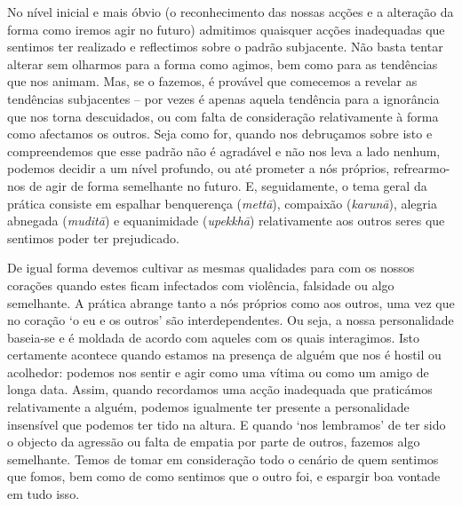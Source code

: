 No nível inicial e mais óbvio (o reconhecimento das nossas acções e a alteração
da forma como iremos agir no futuro) admitimos quaisquer acções inadequadas que
sentimos ter realizado e reflectimos sobre o padrão subjacente. Não basta tentar
alterar sem olharmos para a forma como agimos, bem como para as tendências que
nos animam. Mas, se o fazemos, é provável que comecemos a revelar as tendências
subjacentes -- por vezes é apenas aquela tendência para a ignorância que nos
torna descuidados, ou com falta de consideração relativamente à forma como
afectamos os outros. Seja como for, quando nos debruçamos sobre isto e
compreendemos que esse padrão não é agradável e não nos leva a lado nenhum,
podemos decidir a um nível profundo, ou até prometer a nós próprios,
refrearmo-nos de agir de forma semelhante no futuro. E, seguidamente, o tema
geral da prática consiste em espalhar benquerença (\emph{mettā}), compaixão
(\emph{karunā}), alegria abnegada (\emph{muditā}) e equanimidade
(\emph{upekkhā}) relativamente aos outros seres que sentimos poder ter
prejudicado.

De igual forma devemos cultivar as mesmas qualidades para com os nossos corações
quando estes ficam infectados com violência, falsidade ou algo semelhante. A
prática abrange tanto a nós próprios como aos outros, uma vez que no coração `o
eu e os outros' são interdependentes. Ou seja, a nossa personalidade baseia-se e
é moldada de acordo com aqueles com os quais interagimos. Isto certamente
acontece quando estamos na presença de alguém que nos é hostil ou acolhedor:
podemos nos sentir e agir como uma vítima ou como um amigo de longa data. Assim,
quando recordamos uma acção inadequada que praticámos relativamente a alguém,
podemos igualmente ter presente a personalidade insensível que podemos ter tido
na altura. E quando `nos lembramos' de ter sido o objecto da agressão ou falta
de empatia por parte de outros, fazemos algo semelhante. Temos de tomar em
consideração todo o cenário de quem sentimos que fomos, bem como de como
sentimos que o outro foi, e espargir boa vontade em tudo isso.

